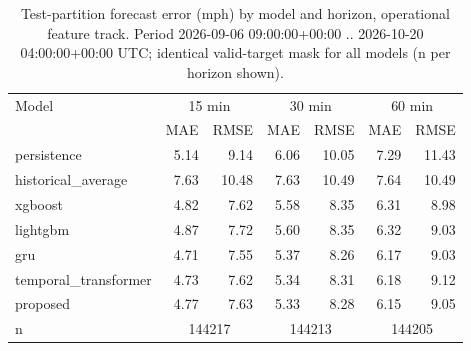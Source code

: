 \begin{table}[t]\centering\caption{Test-partition forecast error (mph) by model and horizon, operational feature track. Period 2026-09-06 09:00:00+00:00 .. 2026-10-20 04:00:00+00:00 UTC; identical valid-target mask for all models (n per horizon shown).}\label{tab:forecast}
\begin{tabular}{lrrrrrr}\toprule
Model & \multicolumn{2}{c}{15 min} & \multicolumn{2}{c}{30 min} & \multicolumn{2}{c}{60 min} \\
 & MAE & RMSE & MAE & RMSE & MAE & RMSE \\ \midrule
persistence & 5.14 & 9.14 & 6.06 & 10.05 & 7.29 & 11.43 \\
historical\_average & 7.63 & 10.48 & 7.63 & 10.49 & 7.64 & 10.49 \\
xgboost & 4.82 & 7.62 & 5.58 & 8.35 & 6.31 & 8.98 \\
lightgbm & 4.87 & 7.72 & 5.60 & 8.35 & 6.32 & 9.03 \\
gru & 4.71 & 7.55 & 5.37 & 8.26 & 6.17 & 9.03 \\
temporal\_transformer & 4.73 & 7.62 & 5.34 & 8.31 & 6.18 & 9.12 \\
proposed & 4.77 & 7.63 & 5.33 & 8.28 & 6.15 & 9.05 \\
\midrule n & \multicolumn{2}{c}{144217} & \multicolumn{2}{c}{144213} & \multicolumn{2}{c}{144205} \\
\bottomrule\end{tabular}\end{table}
